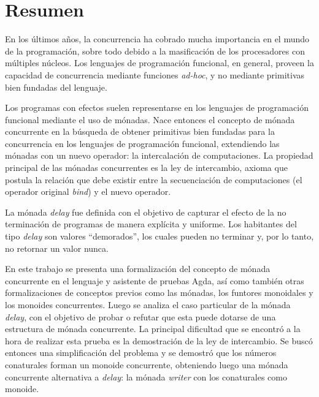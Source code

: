 \chapter*{Resumen}

En los últimos años, la concurrencia ha cobrado mucha importancia en el mundo de la programación, sobre todo debido a la masificación de los procesadores con múltiples núcleos. Los lenguajes de programación funcional, en general, proveen la capacidad de concurrencia mediante funciones \textit{ad-hoc}, y no mediante primitivas bien fundadas del lenguaje. 

Los programas con efectos suelen representarse en los lenguajes de programación funcional mediante el uso de mónadas. Nace entonces el concepto de mónada concurrente en la búsqueda de obtener primitivas bien fundadas para la concurrencia en los lenguajes de programación funcional, extendiendo las mónadas con un nuevo operador: la intercalación de computaciones. La propiedad principal de las mónadas concurrentes es la ley de intercambio, axioma que postula la relación que debe existir entre la secuenciación de computaciones (el operador original \textit{bind}) y el nuevo operador. 
 
La mónada \textit{delay} fue definida con el objetivo de capturar el efecto de la no terminación de programas de manera explícita y uniforme. Los habitantes del tipo \textit{delay} son valores ``demorados'', los cuales pueden no terminar y, por lo tanto, no retornar un valor nunca.

En este trabajo se presenta una formalización del concepto de mónada concurrente en el lenguaje y asistente de pruebas Agda, así como también otras formalizaciones de conceptos previos como las mónadas, los funtores monoidales y los monoides concurrentes. Luego se analiza el caso particular de la mónada \textit{delay}, con el objetivo de probar o refutar que esta puede dotarse de una estructura de mónada concurrente. La principal dificultad que se encontró a la hora de realizar esta prueba es la demostración de la ley de intercambio. Se buscó entonces una simplificación del problema y se demostró que los números conaturales forman un monoide concurrente, obteniendo luego una mónada concurrente alternativa a \textit{delay}: la mónada \textit{writer} con los conaturales como monoide.